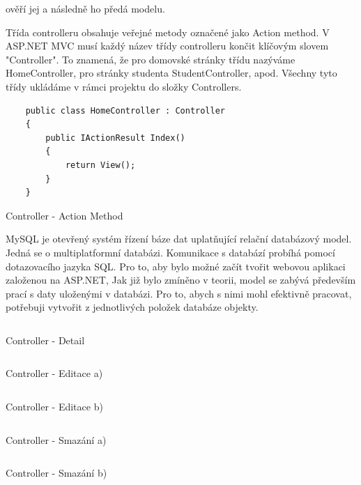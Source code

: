 \documentclass[a4paper, 12pt]{report}
\begin{document}
                ověří jej a následně ho předá modelu.\cite{MVC_Wiki_EN}\par
				Třída controlleru obsahuje veřejné metody označené jako Action method. V ASP.NET MVC musí každý název třídy controlleru končit klíčovým
                slovem "Controller". To znamená, že pro domovské stránky třídu nazýváme HomeController, pro stránky studenta StudentController, apod.
                Všechny tyto třídy ukládáme v rámci projektu do složky Controllers.
	\begin{listing}[H]
	\begin{verbatim}
	public class HomeController : Controller
	{
		public IActionResult Index()
		{
			return View();
		}
	}
	\end{verbatim}
	\caption{Controller - Action Method}
	\label{ActionMethod}
	\end{listing}
	MySQL je otevřený systém řízení báze dat uplatňující relační databázový model. Jedná se o multiplatformní databázi. Komunikace s databází probíhá
    pomocí dotazovacího jazyka SQL.\cite{MySQL_Wiki_CZ}
	Pro to, aby bylo možné začít tvořit webovou aplikaci založenou na ASP.NET,
	Jak již bylo zmíněno v teorii, model se zabývá především prací s daty uloženými v databázi. Pro to, abych s nimi mohl efektivně pracovat, potřebuji
    vytvořit z jednotlivých položek databáze objekty.
	\begin{listing}[H]
	\inputminted{csharp}{SourceCode/Detail.cs}
	\caption{Controller - Detail}
	\label{Detail}
	\end{listing}
	\begin{listing}[H]
	\inputminted{csharp}{SourceCode/Edit.cs}
	\caption{Controller - Editace a)}
	\label{Edit}
	\end{listing}

	\begin{listing}[H]
	\inputminted{csharp}{SourceCode/Edit_Post.cs}
	\caption{Controller - Editace b)}
	\label{Edit_Post}
	\end{listing}
	\begin{listing}[H]
	\inputminted{csharp}{SourceCode/Delete.cs}
	\caption{Controller - Smazání a)}
	\label{Delete}
	\end{listing}
	\begin{listing}[H]
	\inputminted{csharp}{SourceCode/Delete_Post.cs}
	\caption{Controller - Smazání b)}
	\label{Delete_Post}
	\end{listing}

	\seznamTabulek
	
	\seznamObrazku

	\renewcommand\listoflistingscaption{Seznam zdrojových kódů}
	\listoflistings
	

	
	

\end{document}
